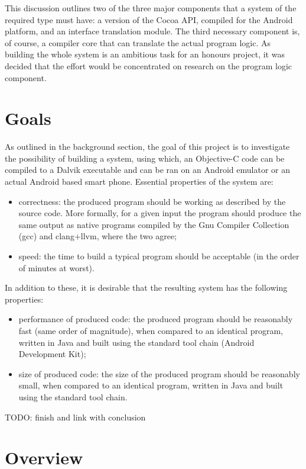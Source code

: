 \documentclass[parskip]{cs4rep}
\begin{document}
This discussion outlines two of the three major components that a system of the required type must have: a version of the Cocoa API, compiled for the Android platform, and an interface translation module. The third necessary component is, of course, a compiler core that can translate the actual program logic. As building the whole system is an ambitious task for an honours project, it was decided that the effort would be concentrated on research on the program logic component.

\section{Goals}

As outlined in the background section, the goal of this project is to investigate the possibility of building a system, using which, an Objective-C code can be compiled to a Dalvik executable and can be ran on an Android emulator or an actual Android based smart phone. Essential properties of the system are:
\begin{itemize}
\item
correctness: the produced program should be working as described by the source code. More formally, for a given input the program should produce the same output as native programs compiled by the Gnu Compiler Collection (gcc) and clang+llvm, where the two agree;
\item
speed: the time to build a typical program should be acceptable (in the order of minutes at worst).
\end{itemize}

In addition to these, it is desirable that the resulting system has the following properties:

\begin{itemize}
\item
performance of produced code: the produced program should be reasonably fast (same order of magnitude), when compared to an identical program, written in Java and built using the standard tool chain (Android Development Kit);
\item
size of produced code: the size of the produced program should be reasonably small, when compared to an identical program, written in Java and built using the standard tool chain.
\end{itemize}

TODO: finish and link with conclusion

\section{Overview}
\end{document}
